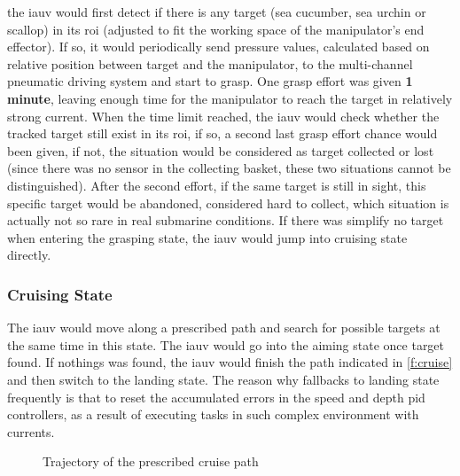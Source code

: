 the \gls{iauv} would first detect if there is any target (sea cucumber, sea
urchin or scallop) in its \gls{roi} (adjusted to fit the working space of the
manipulator's end effector). If so, it would periodically send pressure values,
calculated based on relative position between target and the manipulator, to the
multi-channel pneumatic driving system and start to grasp. One grasp effort was
given \textbf{1 minute}, leaving enough time for the manipulator to reach the
target in relatively strong current. When the time limit reached, the \gls{iauv}
would check whether the tracked target still exist in its \gls{roi}, if so, a
second last grasp effort chance would been given, if not, the situation would be
considered as target collected or lost (since there was no sensor in the
collecting basket, these two situations cannot be distinguished). After the
second effort, if the same target is still in sight, this specific target would
be abandoned, considered hard to collect, which situation is actually not so
rare in real submarine conditions. If there was simplify no target when entering
the grasping state, the \gls{iauv} would jump into cruising state directly.

\subsubsection{Cruising State}

The \gls{iauv} would move along a prescribed path and search for possible
targets at the same time in this state. The \gls{iauv} would go into the aiming
state once target found. If nothings was found, the \gls{iauv} would finish the
path indicated in \autoref{f:cruise} and then switch to the landing state. The
reason why fallbacks to landing state frequently is that to reset the
accumulated errors in the speed and depth \gls{pid} controllers, as a result of
executing tasks in such complex environment with currents.

\begin{figure}
    \caption[Trajectory of the Prescribed Cruise Path]{Trajectory of the
        prescribed cruise path}\label{f:cruise}
\end{figure}

